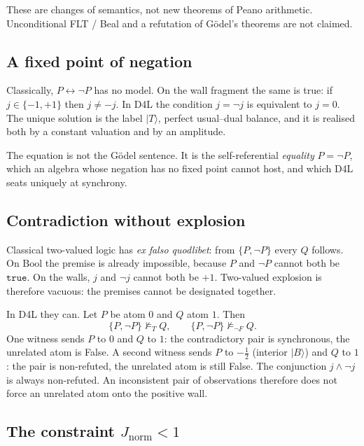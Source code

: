 \documentclass[a4paper]{article}
\theoremstyle{definition}
\newcommand{\Jnorm}{J_{\mathrm{norm}}}
\begin{document}
These are changes of semantics, not new theorems of Peano arithmetic.
Unconditional FLT / Beal and a refutation of G\"odel's theorems are
not claimed.

\subsection{A fixed point of negation}
\label{sec:ex-fp}

Classically, \(P\leftrightarrow\neg P\) has no model. On the wall
fragment the same is true: if \(j\in\{-1,+1\}\) then \(j\neq -j\).
In D4L the condition \(j=\neg j\) is equivalent to \(j=0\). The unique
solution is the label \(\lvert T\rangle\), perfect usual--dual
balance, and it is realised both by a constant valuation and by an
amplitude.

The equation is not the G\"odel sentence. It is the self-referential
\emph{equality} \(P=\neg P\), which an algebra whose negation has no
fixed point cannot host, and which D4L seats uniquely at synchrony.

\subsection{Contradiction without explosion}
\label{sec:ex-efq}

Classical two-valued logic has \emph{ex falso quodlibet}: from
\(\{P,\neg P\}\) every \(Q\) follows. On \(\mathrm{Bool}\) the premise
is already impossible, because \(P\) and \(\neg P\) cannot both be
\(\mathtt{true}\). On the walls, \(j\) and \(\neg j\) cannot both be
\(+1\). Two-valued explosion is therefore vacuous: the premises cannot
be designated together.

In D4L they can. Let \(P\) be atom \(0\) and \(Q\) atom \(1\). Then
\[
\{P,\neg P\}\not\models_T Q,\qquad
\{P,\neg P\}\not\models_{\lnot F} Q.
\]
One witness sends \(P\) to \(0\) and \(Q\) to \(1\): the contradictory
pair is synchronous, the unrelated atom is False. A second witness
sends \(P\) to \(-\tfrac12\) (interior \(\lvert B\rangle\)) and \(Q\)
to \(1\): the pair is non-refuted, the unrelated atom is still False.
The conjunction \(j\wedge\neg j\) is always non-refuted. An
inconsistent pair of observations therefore does not force an unrelated
atom onto the positive wall.

\subsection{\texorpdfstring{The constraint \(\Jnorm<1\)}{The constraint Jnorm < 1}}
\label{sec:ex-notF}
\end{document}
